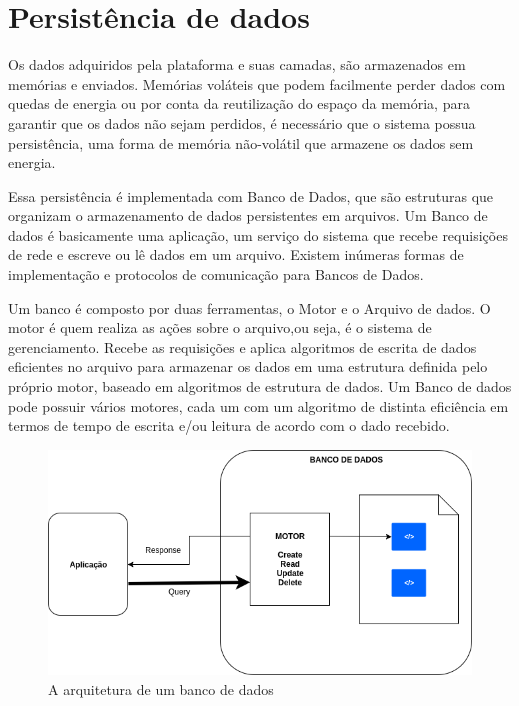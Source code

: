 \section{Persistência de dados}
\label{section:persistencia}

Os dados adquiridos pela plataforma e suas camadas, são armazenados em memórias e enviados. Memórias voláteis que podem facilmente perder dados com quedas de energia ou por conta da reutilização do espaço da memória, para garantir que os dados não sejam perdidos, é necessário que o sistema possua persistência, uma forma de memória não-volátil que armazene os dados sem energia.

Essa persistência é implementada com Banco de Dados, que são estruturas que organizam o armazenamento de dados persistentes em arquivos. Um Banco de dados é  basicamente uma aplicação, um serviço do sistema que recebe requisições de rede e escreve ou lê dados em um arquivo. Existem inúmeras formas de implementação e protocolos de comunicação para Bancos de Dados.

Um banco é composto por duas ferramentas, o Motor e o Arquivo de dados. O motor é quem realiza as ações sobre o arquivo,ou seja, é o sistema de gerenciamento. Recebe as requisições e aplica algoritmos de escrita de dados eficientes no arquivo para armazenar os dados em uma estrutura definida pelo próprio motor, baseado em algoritmos de estrutura de dados. Um Banco de dados pode possuir vários motores, cada um com um algoritmo de distinta eficiência em termos de tempo de escrita e/ou leitura de acordo com o dado recebido.

\begin{figure}[h!]
\centering
\includegraphics[width=12cm]{./02_Capitulos/02_Cap3/figures/Database_Arch}
\caption{A arquitetura de um banco de dados}
\label{fig:3.3.5/database_arch}
\end{figure}

